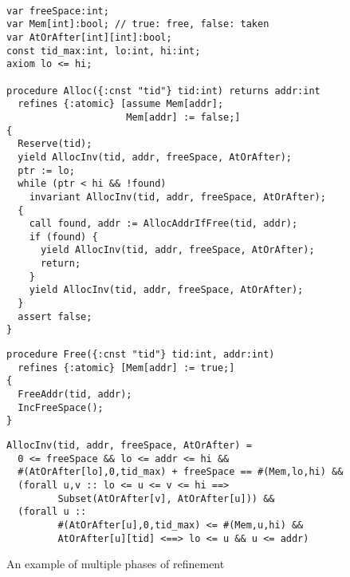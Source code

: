 \begin{figure}
\begin{small}
\begin{verbatim}

var freeSpace:int;
var Mem[int]:bool; // true: free, false: taken
var AtOrAfter[int][int]:bool; 
const tid_max:int, lo:int, hi:int;
axiom lo <= hi;

procedure Alloc({:cnst "tid"} tid:int) returns addr:int
  refines {:atomic} [assume Mem[addr];  
                     Mem[addr] := false;]
{
  Reserve(tid);
  yield AllocInv(tid, addr, freeSpace, AtOrAfter);         
  ptr := lo;
  while (ptr < hi && !found)
    invariant AllocInv(tid, addr, freeSpace, AtOrAfter);
  { 
    call found, addr := AllocAddrIfFree(tid, addr);
    if (found) {
      yield AllocInv(tid, addr, freeSpace, AtOrAfter);
      return;
    } 
    yield AllocInv(tid, addr, freeSpace, AtOrAfter);
  }
  assert false;
}
\end{verbatim}
\begin{verbatim}
procedure Free({:cnst "tid"} tid:int, addr:int)
  refines {:atomic} [Mem[addr] := true;]
{
  FreeAddr(tid, addr);  
  IncFreeSpace(); 
}
\end{verbatim}
\begin{verbatim}
AllocInv(tid, addr, freeSpace, AtOrAfter) = 
  0 <= freeSpace && lo <= addr <= hi &&
  #(AtOrAfter[lo],0,tid_max) + freeSpace == #(Mem,lo,hi) && 
  (forall u,v :: lo <= u <= v <= hi ==> 
         Subset(AtOrAfter[v], AtOrAfter[u])) &&
  (forall u :: 
         #(AtOrAfter[u],0,tid_max) <= #(Mem,u,hi) &&
         AtOrAfter[u][tid] <==> lo <= u && u <= addr)
\end{verbatim}
\end{small}
\caption{An example of multiple phases of refinement}
\label{fig:refTop}
\end{figure}


